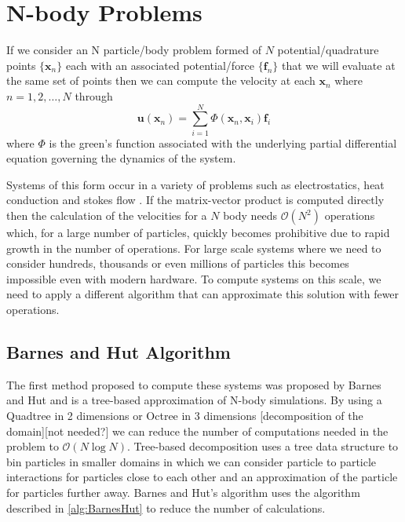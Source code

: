 \FloatBarrier
\section{N-body Problems}
If we consider an N particle/body problem formed of $N$ potential/quadrature points $\{{\bm{x}}_n\}$ each with an associated potential/force $\{{\bm{f}}_n\}$ that we will evaluate at the same set of points then we can compute the velocity at each $\bm{x}_n$ where $n=1,2,\dots,N$ through
\begin{equation*}
    \bm{u}(\bm{x}_n) = \sum_{i=1}^N \Phi(\bm{x}_n,{\bm{x}}_i){\bm{f}}_i
\end{equation*}
where $\Phi$ is the green's function associated with the underlying partial differential equation governing the dynamics of the system.

Systems of this form occur in a variety of problems such as electrostatics, heat conduction and stokes flow \cite{Cortez2015, Beatson, Tornberg2008, Greengard1990APotentials}. If the matrix-vector  product is computed directly then the calculation of the velocities for a $N$ body needs $\mathcal{O}(N^2)$ operations which, for a large number of particles, quickly becomes prohibitive due to rapid growth in the number of operations. For large scale systems where we need to consider hundreds, thousands or even millions of particles this becomes impossible even with modern hardware. To compute systems on this scale, we need to apply a different algorithm that can approximate this solution with fewer operations. 

\subsection{Barnes and Hut Algorithm}
The first method proposed to compute these systems was proposed by Barnes and Hut \cite{Barnes1986} and is a tree-based approximation of N-body simulations. By using a Quadtree in 2 dimensions or Octree in 3 dimensions [decomposition of the domain][not needed?] we can reduce the number of computations needed in the problem to $\mathcal{O}(N\log N)$. Tree-based decomposition uses a tree data structure to bin particles in smaller domains in which we can consider particle to particle interactions for particles close to each other and an approximation of the particle for particles further away. Barnes and Hut's algorithm uses the algorithm described in \cref{alg:BarnesHut} to reduce the number of calculations. 

